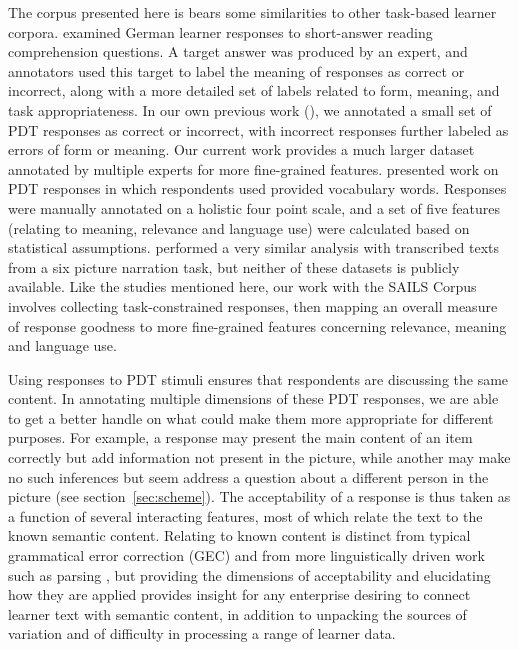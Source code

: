 \documentclass[11pt,a4paper]{article}
\begin{document}
The corpus presented here is bears some similarities to other task-based learner corpora. \citet{meurers2011evaluating} examined German learner responses to short-answer reading comprehension questions. A target answer was produced by an expert, and annotators used this target to label the meaning of responses as correct or incorrect, along with a more detailed set of labels related to form, meaning, and task appropriateness. In our own previous work (\citet{king:dickinson:13, king:dickinson:16}), we annotated a small set of PDT responses as correct or incorrect, with incorrect responses further labeled as errors of form or meaning. Our current work provides a much larger dataset annotated by multiple experts for more fine-grained features. \citet{somasundaran:chodorow:14} presented work on PDT responses in which respondents used provided vocabulary words. Responses were manually annotated on a holistic four point scale, and a set of five features (relating to meaning, relevance and language use) were calculated based on statistical assumptions. \citet{somasundaran:ea:15} performed a very similar analysis with transcribed texts from a six picture narration task, but neither of these datasets is publicly available. Like the studies mentioned here, our work with the SAILS Corpus involves collecting task-constrained responses, then mapping an overall measure of response goodness to more fine-grained features concerning relevance, meaning and language use. 

Using responses to PDT stimuli ensures that respondents are discussing the same content.  In  annotating multiple dimensions of these PDT responses, we are able to get a better handle on what could make them more appropriate for different purposes.  For example, a response may present the main content of an item correctly but add information not present in the picture, while another 
may make no such inferences but seem address a question about a different person in the picture (see section~\ref{sec:scheme}). The acceptability of a response is thus taken as a function of several interacting features, most of which relate the text to the known semantic content.  Relating to known content is distinct from typical grammatical error correction (GEC) \citep{leacock:ea:14} and from more linguistically driven work such as parsing \citep[e.g.,][]{cahill-et-al:14, ragheb:dickinson:14a}, but providing the dimensions of acceptability and elucidating how they are applied provides insight for any enterprise desiring to connect learner text with semantic content, in addition to unpacking the sources of variation and of difficulty in processing a range of learner data.
\end{document}
